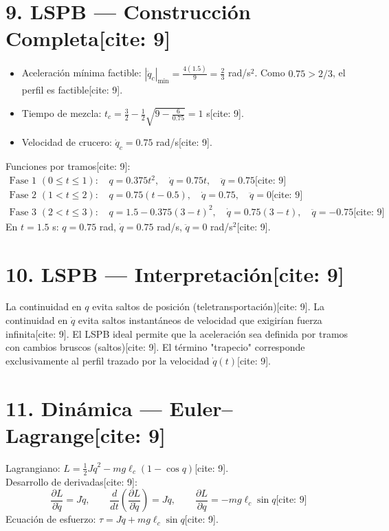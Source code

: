 \documentclass[11pt, a4paper]{article}
\begin{document}
\section*{9. LSPB — Construcción Completa[cite: 9]}
\begin{itemize}
    \item Aceleración mínima factible: $|\ddot{q}_c|_{\min} = \frac{4(1.5)}{9} = \frac{2}{3}$ rad/s$^2$. Como $0.75 > 2/3$, el perfil es factible[cite: 9].
    \item Tiempo de mezcla: $t_c = \frac{3}{2} - \frac{1}{2}\sqrt{9 - \frac{6}{0.75}} = 1$ s[cite: 9].
    \item Velocidad de crucero: $\dot{q}_c = 0.75$ rad/s[cite: 9].
\end{itemize}
Funciones por tramos[cite: 9]:
\begin{align*}
    \text{Fase 1 } (0 \le t \le 1):\quad & q=0.375t^2, \quad \dot{q}=0.75t, \quad \ddot{q}=0.75 \text{[cite: 9]}\\
    \text{Fase 2 } (1 < t \le 2):\quad & q=0.75(t-0.5), \quad \dot{q}=0.75, \quad \ddot{q}=0 \text{[cite: 9]}\\
    \text{Fase 3 } (2 < t \le 3):\quad & q=1.5 - 0.375(3-t)^2, \quad \dot{q}=0.75(3-t), \quad \ddot{q}=-0.75 \text{[cite: 9]}
\end{align*}
En $t=1.5$ s: $q = 0.75$ rad, $\dot{q} = 0.75$ rad/s, $\ddot{q} = 0$ rad/s$^2$[cite: 9].

\section*{10. LSPB — Interpretación[cite: 9]}
La continuidad en $q$ evita saltos de posición (teletransportación)[cite: 9]. La continuidad en $\dot{q}$ evita saltos instantáneos de velocidad que exigirían fuerza infinita[cite: 9]. El LSPB ideal permite que la aceleración sea definida por tramos con cambios bruscos (saltos)[cite: 9]. El término "trapecio" corresponde exclusivamente al perfil trazado por la velocidad $\dot{q}(t)$[cite: 9].

\section*{11. Dinámica — Euler–Lagrange[cite: 9]}
Lagrangiano: $L = \frac{1}{2}J\dot{q}^2 - mg\ell_c(1 - \cos q)$[cite: 9]. \\
Desarrollo de derivadas[cite: 9]:
\begin{equation*}
    \frac{\partial L}{\partial \dot{q}} = J\dot{q}, \qquad \frac{d}{dt}\left(\frac{\partial L}{\partial \dot{q}}\right) = J\ddot{q}, \qquad \frac{\partial L}{\partial q} = -mg\ell_c\sin q \text{[cite: 9]}
\end{equation*}
Ecuación de esfuerzo: $\boxed{\tau = J\ddot{q} + mg\ell_c\sin q}$[cite: 9].
\end{document}
